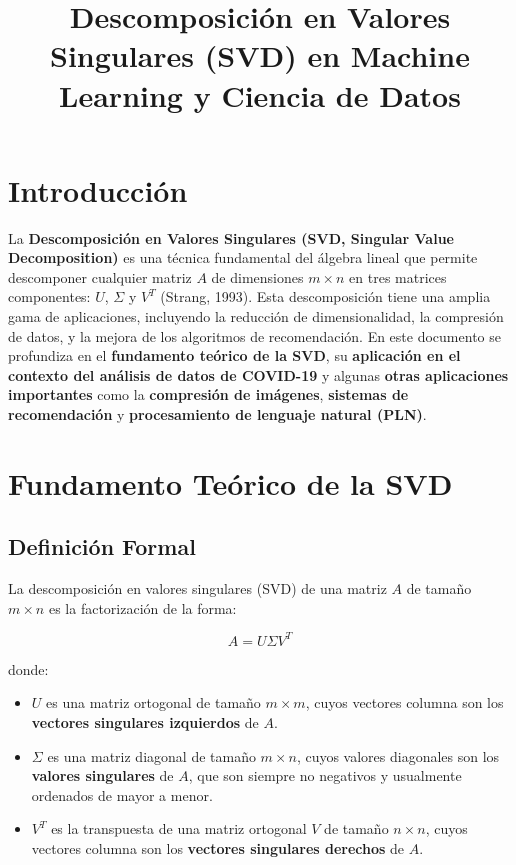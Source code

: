 \documentclass{article}
\title{Descomposición en Valores Singulares (SVD) en Machine Learning y Ciencia de Datos}
\author{}
\date{}
\begin{document}
\maketitle

\section*{Introducción}

La \textbf{Descomposición en Valores Singulares (SVD, Singular Value Decomposition)} es una técnica fundamental del álgebra lineal que permite descomponer cualquier matriz \(A\) de dimensiones \(m \times n\) en tres matrices componentes: \(U\), \(\Sigma\) y \(V^T\) (Strang, 1993). Esta descomposición tiene una amplia gama de aplicaciones, incluyendo la reducción de dimensionalidad, la compresión de datos, y la mejora de los algoritmos de recomendación. En este documento se profundiza en el \textbf{fundamento teórico de la SVD}, su \textbf{aplicación en el contexto del análisis de datos de COVID-19} y algunas \textbf{otras aplicaciones importantes} como la \textbf{compresión de imágenes}, \textbf{sistemas de recomendación} y \textbf{procesamiento de lenguaje natural (PLN)}.

\section{Fundamento Teórico de la SVD}

\subsection{Definición Formal}

La descomposición en valores singulares (SVD) de una matriz \(A\) de tamaño \(m \times n\) es la factorización de la forma:

\[
A = U \Sigma V^T
\]

donde:

\begin{itemize}
  \item \(U\) es una matriz ortogonal de tamaño \(m \times m\), cuyos vectores columna son los \textbf{vectores singulares izquierdos} de \(A\).
  \item \(\Sigma\) es una matriz diagonal de tamaño \(m \times n\), cuyos valores diagonales son los \textbf{valores singulares} de \(A\), que son siempre no negativos y usualmente ordenados de mayor a menor.
  \item \(V^T\) es la transpuesta de una matriz ortogonal \(V\) de tamaño \(n \times n\), cuyos vectores columna son los \textbf{vectores singulares derechos} de \(A\).
\end{itemize}
\end{document}
